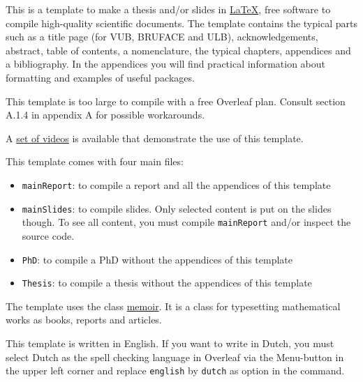 This is a template to make a thesis and/or slides in \href{https://www.latex-project.org}{\LaTeX}, free software to compile high-quality scientific documents. The template contains the typical parts such as a title page (for VUB, BRUFACE and ULB), acknowledgements, abstract, table of contents, a nomenclature, the typical chapters, appendices and a bibliography. In the appendices you will find practical information about formatting and examples of useful packages.

This template is too large to compile with a free Overleaf plan. Consult section A.1.4 in appendix A for possible workarounds. %

A \href{https://vub.cloud.panopto.eu/Panopto/Pages/Sessions/List.aspx?folderID=eb5cbed1-a7f8-4d08-bca3-ad1e00db8d7a}{set of videos} is available that demonstrate the use of this template.

This template comes with four main files:
\begin{itemize}
    \item \texttt{mainReport}: to compile a report and all the appendices of this template
    \item \texttt{mainSlides}: to compile slides. Only selected content is put on the slides though. To see all content, you must compile \texttt{mainReport} and/or inspect the source code.
    \item \texttt{PhD}: to compile a PhD without the appendices of this template
    \item \texttt{Thesis}: to compile a thesis without the appendices of this template
\end{itemize}

The template uses the class \href{https://ctan.org/pkg/memoir?lang=en}{memoir}. It is a class for typesetting mathematical works as books, reports and articles.

This template is written in English. If you want to write in Dutch, you must select Dutch as the spell checking language in Overleaf via the Menu-button in the upper left corner and replace \texttt{english} by \texttt{dutch} as option in the  command.